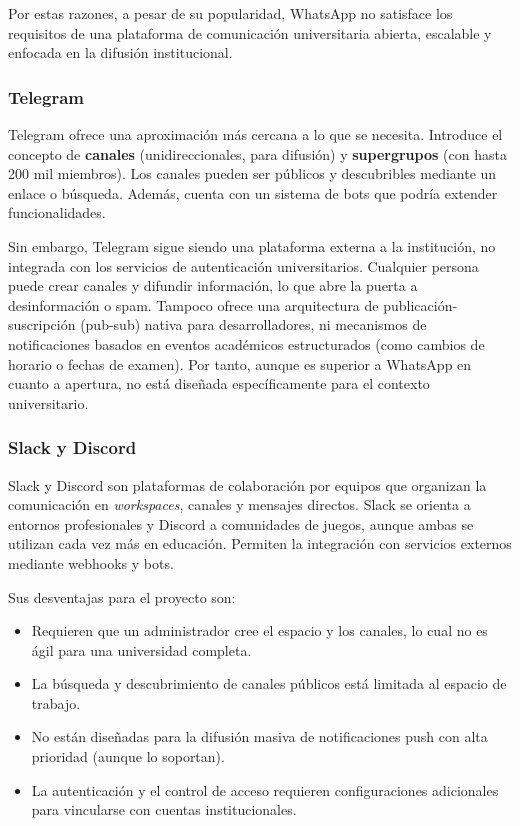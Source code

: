 Por estas razones, a pesar de su popularidad, WhatsApp no satisface los requisitos de una plataforma de comunicación universitaria abierta, escalable y enfocada en la difusión institucional.

\subsubsection{Telegram}

Telegram ofrece una aproximación más cercana a lo que se necesita. Introduce el concepto de \textbf{canales} (unidireccionales, para difusión) y \textbf{supergrupos} (con hasta 200 mil miembros). Los canales pueden ser públicos y descubribles mediante un enlace o búsqueda. Además, cuenta con un sistema de bots que podría extender funcionalidades.

Sin embargo, Telegram sigue siendo una plataforma externa a la institución, no integrada con los servicios de autenticación universitarios. Cualquier persona puede crear canales y difundir información, lo que abre la puerta a desinformación o spam. Tampoco ofrece una arquitectura de publicación-suscripción (pub-sub) nativa para desarrolladores, ni mecanismos de notificaciones basados en eventos académicos estructurados (como cambios de horario o fechas de examen). Por tanto, aunque es superior a WhatsApp en cuanto a apertura, no está diseñada específicamente para el contexto universitario.

\subsubsection{Slack y Discord}

Slack y Discord son plataformas de colaboración por equipos que organizan la comunicación en \textit{workspaces}, canales y mensajes directos. Slack se orienta a entornos profesionales y Discord a comunidades de juegos, aunque ambas se utilizan cada vez más en educación. Permiten la integración con servicios externos mediante webhooks y bots.

Sus desventajas para el proyecto son:

\begin{itemize}
    \item Requieren que un administrador cree el espacio y los canales, lo cual no es ágil para una universidad completa.
    \item La búsqueda y descubrimiento de canales públicos está limitada al espacio de trabajo.
    \item No están diseñadas para la difusión masiva de notificaciones push con alta prioridad (aunque lo soportan).
    \item La autenticación y el control de acceso requieren configuraciones adicionales para vincularse con cuentas institucionales.
\end{itemize}

